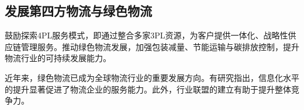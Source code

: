 \documentclass[UTF-8]{CUFEpaper}
\begin{document}
\subsection{发展第四方物流与绿色物流}
鼓励探索4PL服务模式，即通过整合多家3PL资源，为客户提供一体化、战略性供应链管理服务。推动绿色物流发展，加强包装减量、节能运输与碳排放控制，提升物流行业的可持续发展能力。\par
近年来，绿色物流已成为全球物流行业的重要发展方向\parencite{wang2021}。有研究指出，信息化水平的提升显著促进了物流企业的服务能力\parencite{li2020}。此外，行业联盟的建立有助于提升整体竞争力\parencite{zhang2019}。

\clearpage
{}
{} %
\printbibliography
\end{document}
